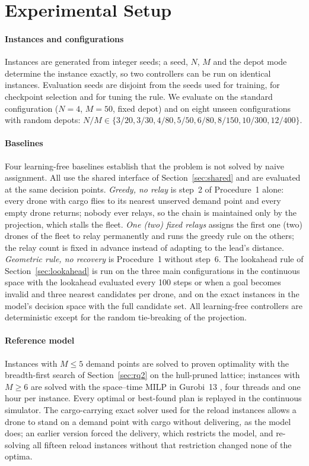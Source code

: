 \documentclass[final,5p,times,twocolumn]{elsarticle}
\begin{document}
\section{Experimental Setup}
\label{sec:setup}

\paragraph{Instances and configurations}
Instances are generated from integer seeds; a seed, $N$, $M$ and the depot mode determine the
instance exactly, so two controllers can be run on identical instances. Evaluation seeds are
disjoint from the seeds used for training, for checkpoint selection and for tuning the rule.
We evaluate on the standard configuration ($N=4$, $M=50$, fixed depot) and on eight unseen
configurations with random depots: $N/M \in \{3/20, 3/30, 4/80, 5/50, 6/80, 8/150, 10/300, 12/400\}$.

\paragraph{Baselines}
Four learning-free baselines establish that the problem is not solved by naive assignment. All
use the shared interface of Section~\ref{sec:shared} and are evaluated at the same decision
points. \emph{Greedy, no relay} is step~2 of Procedure~1 alone: every drone with cargo flies to
its nearest unserved demand point and every empty drone returns; nobody ever relays, so the chain
is maintained only by the projection, which stalls the fleet. \emph{One (two) fixed relays}
assigns the first one (two) drones of the fleet to relay permanently and runs the greedy rule on
the others; the relay count is fixed in advance instead of adapting to the lead's distance.
\emph{Geometric rule, no recovery} is Procedure~1 without step~6. The lookahead rule of
Section~\ref{sec:lookahead} is run on the three main configurations in the continuous space with
the lookahead evaluated every 100 steps or when a goal becomes invalid and three nearest candidates per
drone, and on the exact instances in the model's decision space with the full candidate set.
All learning-free controllers are
deterministic except for the random tie-breaking of the projection.

\paragraph{Reference model}
Instances with $M \le 5$ demand points are solved to proven optimality with the breadth-first
search of Section~\ref{sec:rq2} on the hull-pruned lattice; instances with $M \ge 6$ are solved
with the space--time MILP in Gurobi~13 \cite{gurobi}, four threads and one hour per instance.
Every optimal or best-found plan is replayed in the continuous simulator. The cargo-carrying
exact solver used for the reload instances allows a drone to stand on a demand point with cargo
without delivering, as the model does; an earlier version forced the delivery, which restricts the
model, and re-solving all fifteen reload instances without that restriction changed none of the
optima.
\end{document}
